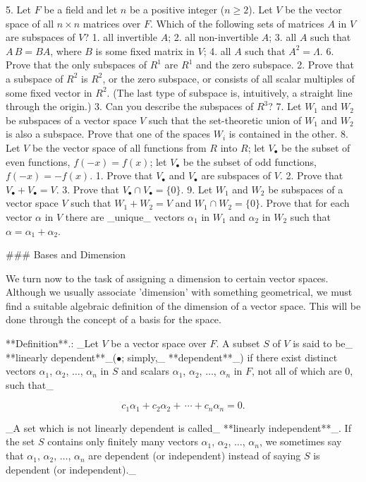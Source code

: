 5. Let \(F\) be a field and let \(n\) be a positive integer (\(n\geq 2\)). Let \(V\) be the vector space of all \(n\times n\) matrices over \(F\). Which of the following sets of matrices \(A\) in \(V\) are subspaces of \(V\)? 1. all invertible \(A\); 2. all non-invertible \(A\); 3. all \(A\) such that \(A\,B=BA\), where \(B\) is some fixed matrix in \(V\); 4. all \(A\) such that \(A^{2}=\Lambda\).
6. Prove that the only subspaces of \(R^{1}\) are \(R^{1}\) and the zero subspace. 2. Prove that a subspace of \(R^{2}\) is \(R^{2}\), or the zero subspace, or consists of all scalar multiples of some fixed vector in \(R^{2}\). (The last type of subspace is, intuitively, a straight line through the origin.) 3. Can you describe the subspaces of \(R^{3}\)? 7. Let \(W_{1}\) and \(W_{2}\) be subspaces of a vector space \(V\) such that the set-theoretic union of \(W_{1}\) and \(W_{2}\) is also a subspace. Prove that one of the spaces \(W_{i}\) is contained in the other. 8. Let \(V\) be the vector space of all functions from \(R\) into \(R\); let \(V_{\bullet}\) be the subset of even functions, \(f(-x)=f(x)\); let \(V_{\bullet}\) be the subset of odd functions, \(f(-x)=-f(x)\). 1. Prove that \(V_{\bullet}\) and \(V_{\bullet}\) are subspaces of \(V\). 2. Prove that \(V_{\bullet}+V_{\bullet}=V\). 3. Prove that \(V_{\bullet}\cap V_{\bullet}=\{0\}\).
9. Let \(W_{1}\) and \(W_{2}\) be subspaces of a vector space \(V\) such that \(W_{1}+W_{2}=V\) and \(W_{1}\cap W_{2}=\{0\}\). Prove that for each vector \(\alpha\) in \(V\) there are _unique_ vectors \(\alpha_{1}\) in \(W_{1}\) and \(\alpha_{2}\) in \(W_{2}\) such that \(\alpha=\alpha_{1}+\alpha_{2}\).

### Bases and Dimension

We turn now to the task of assigning a dimension to certain vector spaces. Although we usually associate 'dimension' with something geometrical, we must find a suitable algebraic definition of the dimension of a vector space. This will be done through the concept of a basis for the space.

**Definition**.: _Let \(V\) be a vector space over \(F\). A subset \(S\) of \(V\) is said to be_ **linearly dependent**_(\(\bullet\); simply,_ **dependent**_) if there exist distinct vectors \(\alpha_{1}\), \(\alpha_{2}\), \(\ldots\), \(\alpha_{n}\) in \(S\) and scalars \(\alpha_{1}\), \(\alpha_{2}\), \(\ldots\), \(\alpha_{n}\) in \(F\), not all of which are \(0\), such that_

\[c_{1}\alpha_{1}+c_{2}\alpha_{2}+\,\cdots+c_{n}\alpha_{n}=0.\]

_A set which is not linearly dependent is called_ **linearly independent**_. If the set \(S\) contains only finitely many vectors \(\alpha_{1}\), \(\alpha_{2}\), \(\ldots\), \(\alpha_{n}\), we sometimes say that \(\alpha_{1}\), \(\alpha_{2}\), \(\ldots\), \(\alpha_{n}\) are dependent (or independent) instead of saying \(S\) is dependent (or independent)._ 